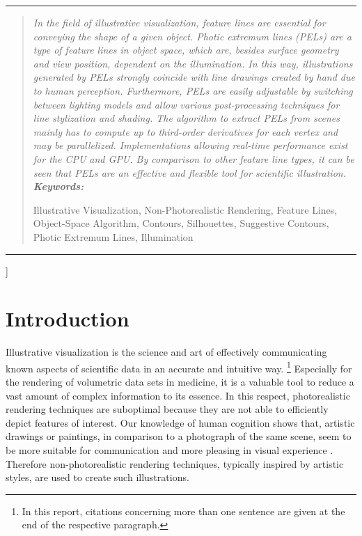 \documentclass[9pt,fleqn,twoside,twocolumn]{stdglobal}
\begin{document}
{\begin{@twocolumnfalse}
\begin{center}
  \end{center}
  \vspace{2em}
  \hrule
  \begin{abstract}
    \itshape
    \noindent
    In the field of illustrative visualization, feature lines are essential for conveying the shape of a given object.
    Photic extremum lines (PELs) are a type of feature lines in object space, which are, besides surface geometry and view position, dependent on the illumination.
    In this way, illustrations generated by PELs strongly coincide with line drawings created by hand due to human perception.
    Furthermore, PELs are easily adjustable by switching between lighting models and allow various post-processing techniques for line stylization and shading.
    The algorithm to extract PELs from scenes mainly has to compute up to third-order derivatives for each vertex and may be parallelized.
    Implementations allowing real-time performance exist for the CPU and GPU.
    By comparison to other feature line types, it can be seen that PELs are an effective and flexible tool for scientific illustration.
    \\

    \noindent
    \textbf{Keywords:}
    \parbox[t]{0.8\textwidth}{Illustrative Visualization, Non-Photorealistic Rendering, Feature Lines, Object-Space Algorithm, Contours, Silhouettes, Suggestive Contours, Photic Extremum Lines, Illumination}
  \end{abstract}
  \hrule
  \vspace{3em}
\end{@twocolumnfalse}}]

\section{Introduction}
  Illustrative visualization is the science and art of effectively communicating known aspects of scientific data in an accurate and intuitive way.
  \footnote{In this report, citations concerning more than one sentence are given at the end of the respective paragraph.}
  Especially for the rendering of volumetric data sets in medicine, it is a valuable tool to reduce a vast amount of complex information to its essence.
  In this respect, photorealistic rendering techniques are suboptimal because they are not able to efficiently depict features of interest.
  Our knowledge of human cognition shows that, artistic drawings or paintings, in comparison to a photograph of the same scene, seem to be more suitable for communication and more pleasing in visual experience \autocite{xie2007}.
  Therefore non-photorealistic rendering techniques, typically inspired by artistic styles, are used to create such illustrations.
  \autocite{viola2005}%
\end{document}

